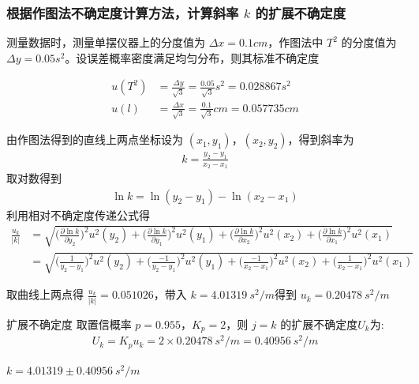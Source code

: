 \documentclass[UTF8]{ctexart}
\begin{document}
\subsubsection{根据作图法不确定度计算方法，计算斜率 $k$ 的扩展不确定度}
测量数据时，测量单摆仪器上的分度值为 $ \Delta x = 0.1cm$，作图法中 $T^2$ 的分度值为 $\Delta y = 0.05s^2$。设误差概率密度满足均匀分布，则其标准不确定度

\begin{align*}
    u(T^2) &= \frac{\Delta y}{\sqrt{3}}  = \frac{0.05}{\sqrt{3}} s^2 = 0.028867 s^2 \\
    u(l) &= \frac{\Delta x}{\sqrt{3}} = \frac{0.1}{\sqrt{3}} cm = 0.057735 cm 
\end{align*}

由作图法得到的直线上两点坐标设为 $(x_1,y_1)$，$(x_2,y_2)$，得到斜率为
\begin{align*}
    k = \frac{y_2 - y_1}{x_2 - x_1}
\end{align*}
取对数得到
\begin{align*}
    \ln{k} = \ln{(y_2 - y_1)} - \ln{(x_2 - x_1)}
\end{align*}
利用相对不确定度传递公式得
\begin{align*}
    \frac{u_k}{|k|} &= \sqrt{ 
    \Big(   \frac{\partial \ln{k} }{\partial y_2}        \Big)^2u^2(y_2)     +
    \Big(   \frac{\partial \ln{k} }{\partial y_1}        \Big)^2u^2(y_1)     +
    \Big(   \frac{\partial \ln{k} }{\partial x_2}        \Big)^2u^2(x_2)     +
    \Big(   \frac{\partial \ln{k} }{\partial x_1}        \Big)^2u^2(x_1)  
    } \\
    &= \sqrt{ 
    \Big(   \frac{1 }{y_2 - y_1}        \Big)^2u^2(y_2)     +
    \Big(   \frac{-1 }{y_2 - y_1}        \Big)^2u^2(y_1)     +
    \Big(   \frac{-1 }{x_2 - x_1}        \Big)^2u^2(x_2)     +
    \Big(   \frac{1 }{x_2 - x_1}        \Big)^2u^2(x_1)  
    }
\end{align*}

取曲线上两点得 $\frac{u_k}{|k|} =  0.051026  $，带入 $k = 4.01319 \ s^2/m $得到 $u_k = 0.20478 \ s^2/m $

扩展不确定度 取置信概率 $p = 0.955$，$K_p = 2$，则 $j=k$ 的扩展不确定度$U_k$为:
\begin{align*}
    U_k = K_p u_k = 2 \times 0.20478 \ s^2/m = 0.40956 \ s^2/m
\end{align*}

$k = 4.01319 \pm 0.40956 \  s^2/m $
\end{document}
